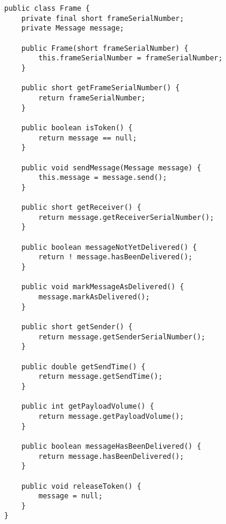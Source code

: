 \begin{lstlisting}
public class Frame {
    private final short frameSerialNumber;
    private Message message;

    public Frame(short frameSerialNumber) {
        this.frameSerialNumber = frameSerialNumber;
    }

    public short getFrameSerialNumber() {
        return frameSerialNumber;
    }

    public boolean isToken() {
        return message == null;
    }

    public void sendMessage(Message message) {
        this.message = message.send();
    }

    public short getReceiver() {
        return message.getReceiverSerialNumber();
    }

    public boolean messageNotYetDelivered() {
        return ! message.hasBeenDelivered();
    }

    public void markMessageAsDelivered() {
        message.markAsDelivered();
    }

    public short getSender() {
        return message.getSenderSerialNumber();
    }

    public double getSendTime() {
        return message.getSendTime();
    }

    public int getPayloadVolume() {
        return message.getPayloadVolume();
    }

    public boolean messageHasBeenDelivered() {
        return message.hasBeenDelivered();
    }

    public void releaseToken() {
        message = null;
    }
}
\end{lstlisting}
